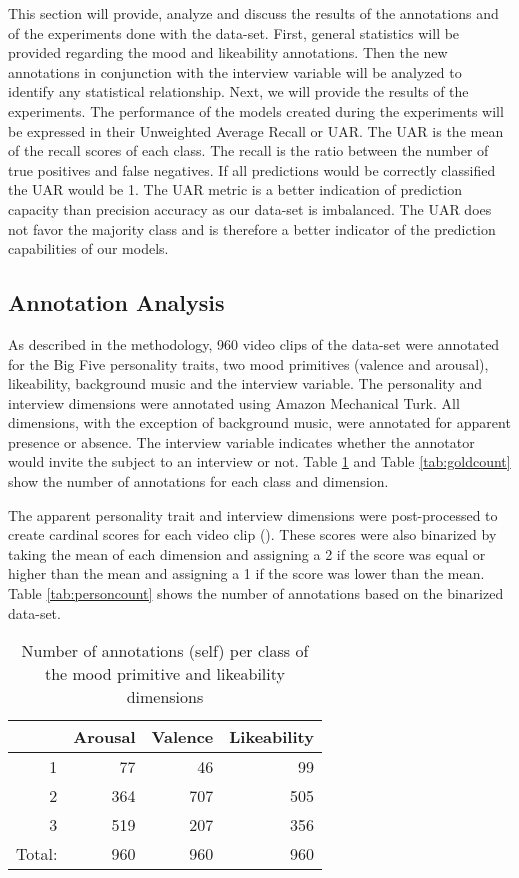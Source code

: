 This section will provide, analyze and discuss the results of the annotations and of the experiments done with the data-set. First, general statistics will be provided regarding the mood and likeability annotations. Then the new annotations in conjunction with the interview variable will be analyzed to identify any statistical relationship. Next, we will provide the results of the experiments. The performance of the models created during the experiments will be expressed in their Unweighted Average Recall or UAR. The UAR is the mean of the recall scores of each class. The recall is the ratio between the number of true positives and false negatives. If all predictions would be correctly classified the UAR would be 1. The UAR metric  is a better indication of prediction capacity than precision accuracy as our data-set is imbalanced. The UAR does not favor the majority class and is therefore a better indicator of the prediction capabilities of our models.
\break

\subsection{Annotation Analysis}
As described in the methodology, 960 video clips of the data-set were annotated for the Big Five personality traits, two mood primitives (valence and arousal), likeability, background music and the interview variable. The personality and interview dimensions were annotated using Amazon Mechanical Turk. All dimensions, with the exception of background music, were annotated for apparent presence or absence. The interview variable indicates whether the annotator would invite the subject to an interview or not. Table \ref{tab:selfcount} and Table \ref{tab:goldcount} show the number of annotations for each class and dimension. 

The apparent personality trait and interview dimensions were post-processed to create cardinal scores for each video clip (\cite{escalante2018explaining}). These scores were also binarized by taking the mean of each dimension and assigning a 2 if the score was equal or higher than the mean and assigning a 1 if the score was lower than the mean. Table \ref{tab:personcount} shows the number of annotations based on the binarized data-set. 

\begin{table}[h]
\begin{tabular}{|r|r|r|r|}
\hline
\rowcolor{Gray} 
\multicolumn{1}{|l|}{Class} &
  \multicolumn{1}{l|}{Arousal} &
  \multicolumn{1}{l|}{Valence} &
  \multicolumn{1}{l|}{Likeability} \\ \hline
1                           & 77  & 46  & 99  \\ \hline
2                           & 364 & 707 & 505 \\ \hline
3                           & 519 & 207 & 356 \\ \hline
\multicolumn{1}{|l|}{Total:} & 960 & 960 & 960 \\ \hline
\end{tabular}
\caption{Number of annotations (self) per class of the mood primitive and likeability dimensions}
\label{tab:selfcount}
\end{table}

